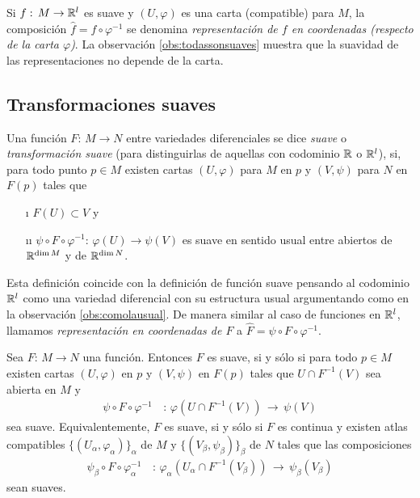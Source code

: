 Si $f:\,M\rightarrow\mathbb{R}^{l}$ es suave y $(U,\varphi)$ es una carta
(compatible) para $M$, la composici\'{o}n $\hat{f}=f\circ\varphi^{-1}$ se
denomina \emph{representaci\'{o}n de $f$ en coordenadas (respecto de la %
carta $\varphi$)}. La observaci\'{o}n \ref{obs:todassonsuaves} muestra que
la suavidad de las representaciones no depende de la carta.

\subsection{Transformaciones suaves}
Una funci\'{o}n $F:\,M\rightarrow N$ entre variedades diferenciales se dice
\emph{suave} o \emph{transformaci\'{o}n suave} (para distinguirlas de aquellas
con codominio $\mathbb{R}$ o $\mathbb{R}^{l}$), si, para todo punto $p\in M$
existen cartas $(U,\varphi)$ para $M$ en $p$ y $(V,\psi)$ para $N$ en
$F(p)$ tales que
\begin{itemize}
	\item[\i] $F(U)\subset V$ y
	\item[\i\i] $\psi\circ F\circ\varphi^{-1}:\,%
		\varphi(U)\rightarrow\psi(V)$ es suave en sentido usual entre
		abiertos de $\mathbb{R}^{\mathrm{dim}\,M}$ y de $\mathbb{R}^{\mathrm{dim}\,N}$.
\end{itemize}
%
Esta definici\'{o}n coincide con la definici\'{o}n de funci\'{o}n suave
pensando al codominio $\mathbb{R}^{l}$ como una variedad diferencial con su
estructura usual argumentando como en la observaci\'{o}n
\ref{obs:comolausual}. De manera similar al caso de funciones en $\mathbb{R}^{l}$,
llamamos \emph{representaci\'{o}n en coordenadas de $F$} a
$\hat{F}=\psi\circ F\circ\varphi^{-1}$.

\begin{obsOtrasCaracterizacionesDeSuavidad}\label{obsotrassuavidad}
	Sea $F:\,M\rightarrow N$ una funci\'{o}n. Entonces $F$ es suave, si
	y s\'{o}lo si para todo $p\in M$ existen cartas $(U,\varphi)$ en
	$p$ y $(V,\psi)$ en $F(p)$ tales que $U\cap F^{-1}(V)$ sea abierta
	en $M$ y
	\begin{align*}
		\psi\circ F\circ\varphi^{-1} & \,:\,
			\varphi(U\cap F^{-1}(V))\,\rightarrow\,\psi(V)
	\end{align*}
	sea suave. Equivalentemente, $F$ es suave, si y s\'{o}lo si
	$F$ es continua y existen atlas compatibles
	$\{(U_{\alpha},\varphi_{\alpha})\}_{\alpha}$ de $M$ y
	$\{(V_{\beta},\psi_{\beta})\}_{\beta}$ de $N$ tales que las
	composiciones
	\begin{align*}
		\psi_{\beta}\circ F\circ\varphi_{\alpha}^{-1} & \,:\,
			\varphi_{\alpha}(U_{\alpha}\cap F^{-1}(V_{\beta}))
			\,\rightarrow\,\psi_{\beta}(V_{\beta})
	\end{align*}
	sean suaves.
\end{obsOtrasCaracterizacionesDeSuavidad}

